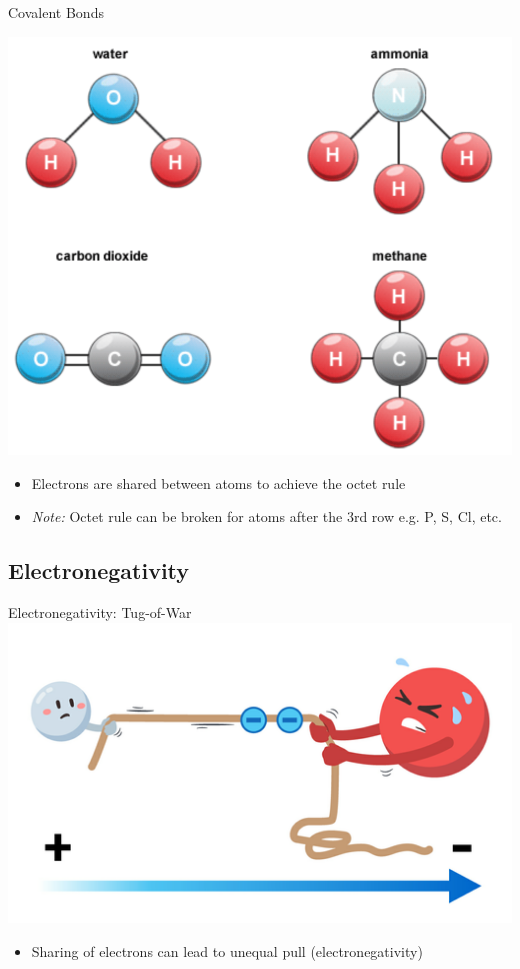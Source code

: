 \documentclass[11pt]{beamer}
\begin{document}
\begin{frame}{Covalent Bonds}
  \begin{center}
    \includegraphics[width=0.6\linewidth]{molec_example}
  \end{center}
  \begin{itemize}
  \item Electrons are shared between atoms to achieve
    the octet rule
  \item \textit{Note:} Octet rule can be broken for atoms
    after the 3rd row e.g. P, S, Cl, etc.
  \end{itemize}
\end{frame}

\subsection{Electronegativity}

\begin{frame}{Electronegativity: Tug-of-War}
  \centering
  \includegraphics[width=0.8\linewidth]{water_tug}
  \begin{itemize}
  \item Sharing of electrons can lead to unequal pull
    (electronegativity)
  \end{itemize}
\end{frame}
\end{document}
